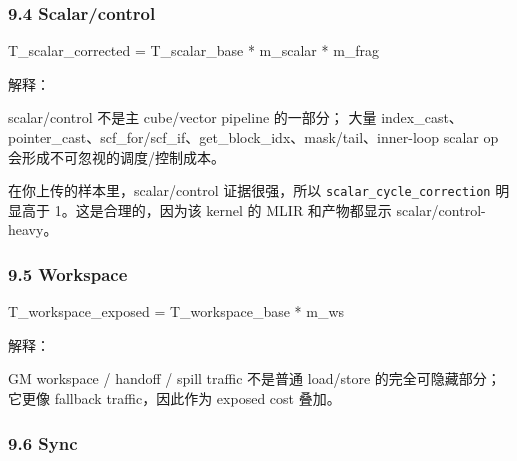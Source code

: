\documentclass[
  10pt,
]{article}
\newenvironment{Shaded}{}{}
\newcommand{\NormalTok}[1]{#1}
\begin{document}
\subsubsection{9.4 Scalar/control}\label{scalarcontrol}

\begin{Shaded}
\begin{Highlighting}[]
\NormalTok{T\_scalar\_corrected = T\_scalar\_base * m\_scalar * m\_frag}
\end{Highlighting}
\end{Shaded}

解释：

\begin{Shaded}
\begin{Highlighting}[]
\NormalTok{scalar/control 不是主 cube/vector pipeline 的一部分；}
\NormalTok{大量 index\_cast、pointer\_cast、scf\_for/scf\_if、get\_block\_idx、mask/tail、inner{-}loop scalar op 会形成不可忽视的调度/控制成本。}
\end{Highlighting}
\end{Shaded}

在你上传的样本里，scalar/control 证据很强，所以
\texttt{scalar\_cycle\_correction} 明显高于 1。这是合理的，因为该 kernel
的 MLIR 和产物都显示 scalar/control-heavy。

\subsubsection{9.5 Workspace}\label{workspace}

\begin{Shaded}
\begin{Highlighting}[]
\NormalTok{T\_workspace\_exposed = T\_workspace\_base * m\_ws}
\end{Highlighting}
\end{Shaded}

解释：

\begin{Shaded}
\begin{Highlighting}[]
\NormalTok{GM workspace / handoff / spill traffic 不是普通 load/store 的完全可隐藏部分；}
\NormalTok{它更像 fallback traffic，因此作为 exposed cost 叠加。}
\end{Highlighting}
\end{Shaded}

\subsubsection{9.6 Sync}\label{sync}
\end{document}
